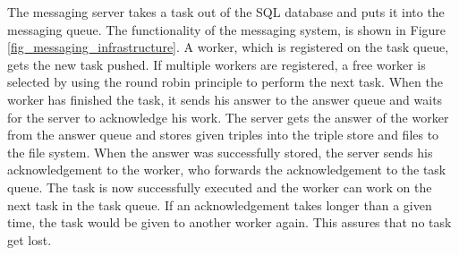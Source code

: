 The messaging server takes a task out of the SQL database and puts it into the messaging queue.
The functionality of the messaging system, is shown in Figure \ref{fig_messaging_infrastructure}.
A worker, which is registered on the task queue, gets the new task pushed.
If multiple workers are registered, a free worker is selected by using the round robin principle to perform the next task.
When the worker has finished the task, it sends his answer to the answer queue and waits for the server to acknowledge his work.
The server gets the answer of the worker from the answer queue and stores given triples into the triple store and files to the file system.
When the answer was successfully stored, the server sends his acknowledgement to the worker, who forwards the acknowledgement to the task queue.
The task is now successfully executed and the worker can work on the next task in the task queue.
If an acknowledgement takes longer than a given time, the task would be given to another worker again. This assures that no task get lost.
